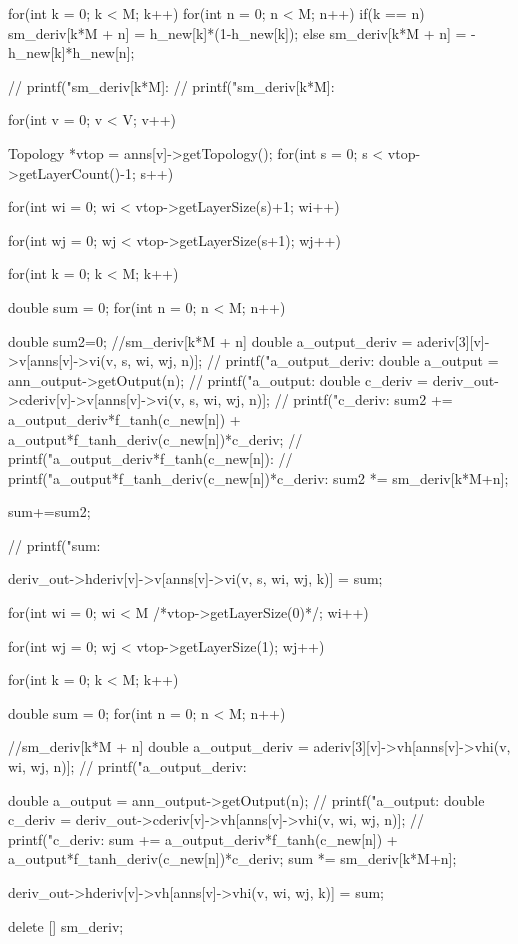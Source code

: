 {  for(int k = 0; k < M; k++)
    for(int n = 0; n < M; n++)
      if(k == n) sm_deriv[k*M + n] = h_new[k]*(1-h_new[k]);
      else sm_deriv[k*M + n] = -h_new[k]*h_new[n];

      // printf("sm_deriv[k*M]: %
      // printf("sm_deriv[k*M]: %

      for(int v = 0; v < V; v++){
        Topology *vtop = anns[v]->getTopology();
        for(int s = 0; s < vtop->getLayerCount()-1; s++){
          for(int wi = 0; wi < vtop->getLayerSize(s)+1; wi++){
            for(int wj = 0; wj < vtop->getLayerSize(s+1); wj++){
              for(int k = 0; k < M; k++){
                double sum = 0;
                for(int n = 0; n < M; n++){
                  double sum2=0;
                  //sm_deriv[k*M + n]
                  double a_output_deriv = aderiv[3][v]->v[anns[v]->vi(v, s, wi, wj, n)];
                  // printf("a_output_deriv: %
                  double a_output = ann_output->getOutput(n);
                  // printf("a_output: %
                  double c_deriv = deriv_out->cderiv[v]->v[anns[v]->vi(v, s, wi, wj, n)];
                  // printf("c_deriv: %
                  sum2 += a_output_deriv*f_tanh(c_new[n]) + a_output*f_tanh_deriv(c_new[n])*c_deriv;
                  // printf("a_output_deriv*f_tanh(c_new[n]): %
                  // printf("a_output*f_tanh_deriv(c_new[n])*c_deriv: %
                  sum2 *= sm_deriv[k*M+n];

                  sum+=sum2;

                  // printf("sum: %
                }
                deriv_out->hderiv[v]->v[anns[v]->vi(v, s, wi, wj, k)] = sum;

              }
            }
          }
        }


        for(int wi = 0; wi < M /*vtop->getLayerSize(0)*/; wi++){
          for(int wj = 0; wj < vtop->getLayerSize(1); wj++){
            for(int k = 0; k < M; k++){
              double sum = 0;
              for(int n = 0; n < M; n++){
                //sm_deriv[k*M + n]
                double a_output_deriv = aderiv[3][v]->vh[anns[v]->vhi(v, wi, wj, n)];
                // printf("a_output_deriv:%

                double a_output = ann_output->getOutput(n);
                // printf("a_output:%
                double c_deriv = deriv_out->cderiv[v]->vh[anns[v]->vhi(v, wi, wj, n)];
                // printf("c_deriv:%
                sum += a_output_deriv*f_tanh(c_new[n]) + a_output*f_tanh_deriv(c_new[n])*c_deriv;
                sum *= sm_deriv[k*M+n];
              }
              deriv_out->hderiv[v]->vh[anns[v]->vhi(v, wi, wj, k)] = sum;

            }
          }
        }
      }

  delete [] sm_deriv;

}

